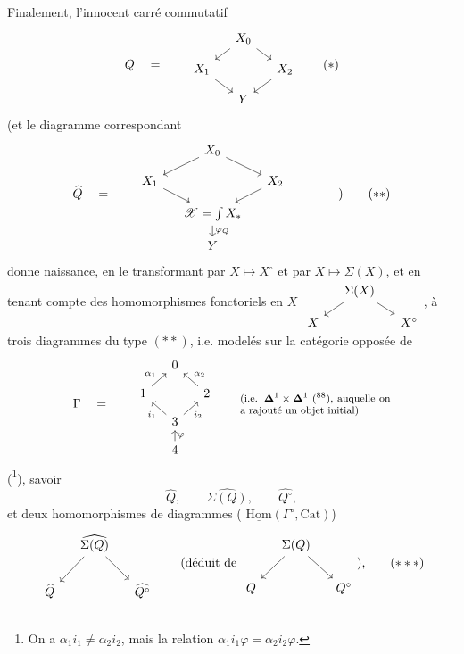 \documentclass[11pt]{article}
\newcommand{\printedpage}[1]{\marginpar{\footnotesize p.~#1}}
\newcommand{\msp}[1]{\marginpar{\footnotesize [#1]}}
\newcommand{\Cat}{\mathrm{Cat}}
\newcommand{\Hom}{\mathrm{Hom}}
\newcommand{\sX}{\mathscr{X}}
\begin{document}
Finalement, l'innocent carré commutatif
\[
Q \quad = \qquad
\begin{tikzcd}[row sep=small, column sep=small]
 & X_0 \arrow[dl] \arrow[dr] & \\
X_1 \arrow[dr] & & X_2 \arrow[dl] \\
 & Y &
\end{tikzcd}
\tag*{$(*)$}
\]
(et le diagramme correspondant
\[
\widehat{Q} \quad = \qquad
\begin{tikzcd}[row sep=small, column sep=small]
 & X_0 \arrow[dl] \arrow[dr] & \\
X_1 \arrow[dr] & & X_2 \arrow[dl] \\
 & \sX=\int X_* \arrow[d, "\varphi_Q"] & \\
 & Y &
\end{tikzcd}
\qquad\qquad )
\tag*{$(**)$}
\]
donne naissance, en le transformant
\msp{page 139}
par $X\longmapsto X^\circ$ et par $X\longmapsto\Sigma(X)$, et en tenant compte des homomorphismes fonctoriels en $X$ $\begin{tikzcd}[row sep=small, column sep=small]
 & \Sigma(X) \arrow[dl] \arrow[dr] & \\
X & & X^\circ
\end{tikzcd}$, à trois diagrammes du type $(**)$, i.e. modelés sur la catégorie opposée de
\[
\Gamma \quad = \qquad
\begin{tikzcd}[row sep=small, column sep=small]
 & 0 & \\
1 \arrow[ur, "\alpha_1"] & & 2 \arrow[ul, "\alpha_2"'] \\
 & 3 \arrow[ul, "i_1"] \arrow[ur, "i_2"'] & \\
 & 4 \arrow[u, "\varphi"'] &
\end{tikzcd}
\qquad
\text{\parbox[c]{0.35\textwidth}{\footnotesize (i.e. $\boldsymbol{\Delta}^1\times\boldsymbol{\Delta}^1$ (\footnotemark[88]), auquelle on a rajouté un objet initial)}} %
\]
\printedpage{95}
(\footnote[89]{On a $\alpha_1i_1\neq\alpha_2i_2$, mais la relation $\alpha_1i_1\varphi=\alpha_2i_2\varphi$.}), savoir
\[
\widehat{Q}, \qquad \widehat{\Sigma(Q)}, \qquad \widehat{Q^\circ},
\]
et deux homomorphismes de diagrammes ( $\underline{\Hom}(\Gamma^\circ,\Cat)$)
\[
\begin{tikzcd}[column sep=small]
 & \widehat{\Sigma(Q)} \arrow[dl] \arrow[dr] & \\
\widehat{Q} & & \widehat{Q^\circ}
\end{tikzcd}
\qquad
\text{(déduit de }
\begin{tikzcd}[column sep=small]
 & \Sigma(Q) \arrow[dl] \arrow[dr] & \\
Q & & Q^\circ
\end{tikzcd}
\text{),}
\tag*{$(***)$}
\]
\end{document}
